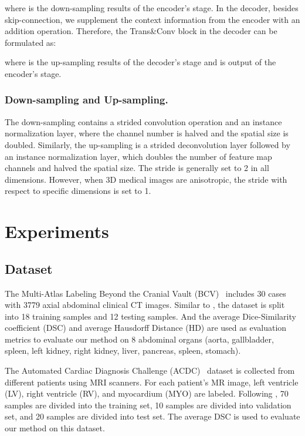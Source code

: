 \documentclass[runningheads]{llncs}
\begin{document}
where  is the down-sampling results of the encoder's  stage. In the decoder, besides skip-connection, we supplement the context information from the encoder with an addition operation. Therefore, the Trans\&Conv block in the decoder can be formulated as:

where  is the up-sampling results of the decoder's  stage and  is output of the encoder's  stage.

\subsubsection{Down-sampling and Up-sampling.} 
The down-sampling contains a strided convolution operation and an instance normalization layer, where the channel number is halved and the spatial size is doubled. Similarly, the up-sampling is a strided deconvolution layer followed by an instance normalization layer, which doubles the number of feature map channels and halved the spatial size. The stride is generally set to 2 in all dimensions. However, when 3D medical images are anisotropic, the stride with respect to specific dimensions is set to 1. 

\section{Experiments}
\subsection{Dataset}

The Multi-Atlas Labeling Beyond the Cranial Vault (BCV)~\cite{BCV} includes 30 cases with 3779 axial abdominal clinical CT images. Similar to \cite{nnformer}, the dataset is split into 18 training samples and 12 testing samples. And the average Dice-Similarity coefficient (DSC) and average Hausdorff Distance (HD) are used as evaluation metrics to evaluate our method on 8 abdominal organs (aorta, gallbladder, spleen, left kidney, right kidney, liver, pancreas, spleen, stomach).

The Automated Cardiac Diagnosis Challenge (ACDC)~\cite{ACDC} dataset is collected from different patients using MRI scanners. For each patient's MR image, left ventricle (LV), right ventricle (RV), and myocardium (MYO) are labeled. Following \cite{nnformer}, 70 samples are divided into the training set, 10 samples are divided into validation set, and 20 samples are divided into test set. The average DSC is used to evaluate our method on this dataset.
\end{document}
